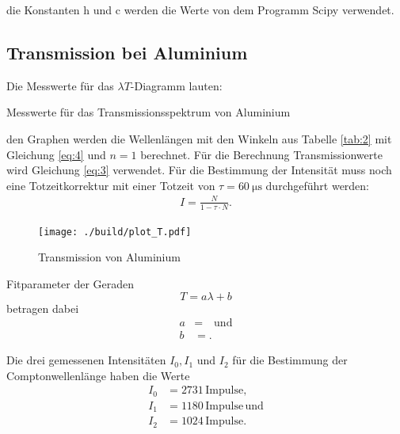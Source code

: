 \justifying die Konstanten h und c werden die Werte von dem Programm Scipy  \cite{scipy} verwendet.

\subsection{Transmission bei Aluminium}

Die Messwerte für das $\lambda T$-Diagramm lauten:  

\begin{table}[H]
    \centering
    
    \caption{Messwerte für das Transmissionsspektrum von Aluminium}
    \label{tab:2}
\end{table}


\justifying den Graphen werden die Wellenlängen mit den Winkeln aus Tabelle \ref{tab:2}
mit Gleichung \eqref{eq:4} und $n=1$ berechnet.
Für die Berechnung Transmissionwerte wird Gleichung \eqref{eq:3} verwendet.
Für die Bestimmung der Intensität muss noch eine Totzeitkorrektur mit einer
Totzeit von $\tau = \SI{60}{\micro\second} $ durchgeführt werden:
\begin{align}
    I = \frac{N}{1-\tau \cdot N} \label{eq:9}.
\end{align}

\begin{figure}[H]
    \centering
    \texttt{[image: ./build/plot\_T.pdf]}
    \caption{Transmission von Aluminium \cite{matplotlib}}
    \label{fig:4}
\end{figure}

 Fitparameter der Geraden
\begin{equation}
    T=a \lambda +b \label{eq:10}
\end{equation}
betragen dabei
\begin{align}
    a &= \text{}\quad \text{und} \label{eq:11} \\
    b &= \text{}.\label{eq:12}
\end{align}

Die drei gemessenen Intensitäten $I_0, I_1$ und $I_2$ für die Bestimmung der Comptonwellenlänge
haben die Werte
\begin{subequations}
\begin{align}
    I_0 &= 2731 \,\text{Impulse} \label{eq:13a}, \\
    I_1 &= 1180\,\text{Impulse}\, \label{eq:13b} \text{und} \\
    I_2 &=1024 \,\text{Impulse}\label{eq:13c}.
\end{align}
\end{subequations}

